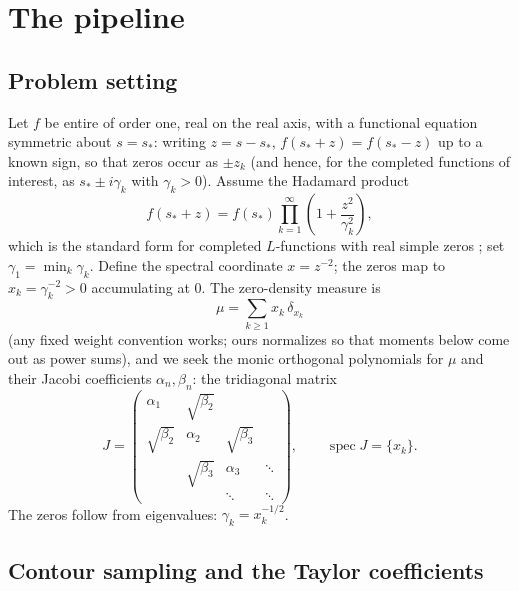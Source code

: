 \documentclass[11pt]{article}
\theoremstyle{definition}
\begin{document}
\section{The pipeline}\label{sec:pipeline}

\subsection{Problem setting}

Let $f$ be entire of order one, real on the real axis, with a
functional equation symmetric about $s=s_\ast$: writing
$z=s-s_\ast$, $f(s_\ast+z)=f(s_\ast-z)$ up to a known sign, so that
zeros occur as $\pm z_k$ (and hence, for the completed functions of
interest, as $s_\ast\pm i\gamma_k$ with $\gamma_k>0$). Assume the
Hadamard product
\begin{equation}\label{eq:hadamard}
f(s_\ast+z)=f(s_\ast)\prod_{k=1}^{\infty}\left(1+\frac{z^2}{\gamma_k^2}\right),
\end{equation}
which is the standard form for completed $L$-functions with real
simple zeros \cite{Titchmarsh}; set $\gamma_1=\min_k\gamma_k$.
Define the spectral coordinate $x=z^{-2}$; the zeros map to
$x_k=\gamma_k^{-2}>0$ accumulating at $0$. The zero-density measure
is
\begin{equation}\label{eq:measure}
\mu=\sum_{k\ge1} x_k\,\delta_{x_k}
\end{equation}
(any fixed weight convention works; ours normalizes so that moments
below come out as power sums), and we seek the monic orthogonal
polynomials for $\mu$ and their Jacobi coefficients
$\alpha_n,\beta_n$: the tridiagonal matrix
\begin{equation}\label{eq:jacobi}
J=\begin{pmatrix}
\alpha_1 & \sqrt{\beta_2}\\
\sqrt{\beta_2} & \alpha_2 & \sqrt{\beta_3}\\
& \sqrt{\beta_3} & \alpha_3 & \ddots\\
&&\ddots&\ddots
\end{pmatrix},
\qquad \operatorname{spec} J=\{x_k\}.
\end{equation}
The zeros follow from eigenvalues: $\gamma_k=x_k^{-1/2}$.

\subsection{Contour sampling and the Taylor coefficients}
\end{document}
